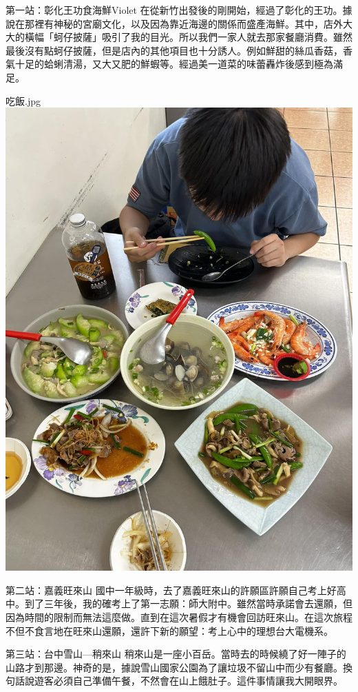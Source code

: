 \documentclass{article}
\begin{document}

\begin{large}
\begin{boxpar}{第一站：彰化王功食海鮮}{Violet}
在從新竹出發後的剛開始，經過了彰化的王功。據說在那裡有神秘的宮廟文化，以及因為靠近海邊的關係而盛產海鮮。其中，店外大大的橫幅「蚵仔披薩」吸引了我的目光。所以我們一家人就去那家餐廳消費。雖然最後沒有點蚵仔披薩，但是店內的其他項目也十分誘人。例如鮮甜的絲瓜香菇，香氣十足的蛤蜊清湯，又大又肥的鮮蝦等。經過美一道菜的味蕾轟炸後感到極為滿足。
\begin{imgbox}{吃飯.jpg}
    \includegraphics[width=0.65\textheight]{src/seafood.jpg}
\end{imgbox}

\end{boxpar}
    \begin{boxpar}{第二站：嘉義旺來山}
        國中一年級時，去了嘉義旺來山的許願區許願自己考上好高中。到了三年後，我的確考上了第一志願：師大附中。雖然當時承諾會去還願，但因為時間的限制而無法這麼做。直到在這次暑假才有機會回訪旺來山。在這次旅程不但不食言地在旺來山還願，還許下新的願望：考上心中的理想台大電機系。
    \end{boxpar}
    \begin{boxpar}{第三站：台中雪山—稍來山}
        稍來山是一座小百岳。當時去的時候繞了好一陣子的山路才到那邊。神奇的是，據說雪山國家公園為了讓垃圾不留山中而少有餐廳。換句話說遊客必須自己準備午餐，不然會在山上餓肚子。這件事情讓我大開眼界。
    \end{boxpar}

\end{large}
\end{document}

